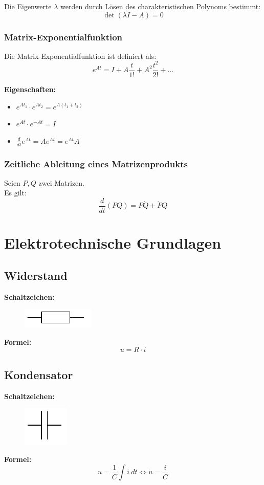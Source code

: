 \documentclass[10pt,a4paper]{article}
\begin{document}
Die Eigenwerte $\lambda$ werden durch Lösen des charakteristischen Polynoms bestimmt:
$$
	\det(\lambda I - A) = 0
$$

\subsubsection{Matrix-Exponentialfunktion}
Die Matrix-Exponentialfunktion ist definiert als:
$$
	e^{At} = I + A\frac{t}{1!} + A^2 \frac{t^2}{2!} + \dots
$$

\textbf{Eigenschaften:}
\begin{itemize}
	\item $e^{At_1} ⋅ e^{At_2} = e^{A(t_1 + t_2)}$
	\item $e^{At} ⋅ e^{-At} = I$
	\item $\frac{d}{dt} e^{At} = Ae^{At} = e^{At}A$
\end{itemize}

\subsubsection{Zeitliche Ableitung eines Matrizenprodukts}
Seien $P,Q$ zwei Matrizen. \\
Es gilt:
$$
	\frac{d}{dt}(PQ) = P \dot Q + \dot P Q
$$

\section{Elektrotechnische Grundlagen}
\subsection{Widerstand}
\textbf{Schaltzeichen:} \\
\begin{figure}[H]
	\includegraphics[width=0.15\columnwidth]{imgs/widerstand.pdf}
\end{figure}
\textbf{Formel:}
$$
	u = R ⋅ i
$$

\subsection{Kondensator}
\textbf{Schaltzeichen:} \\
\begin{figure}[H]
	\includegraphics[width=0.1\columnwidth]{imgs/kondensator.pdf}
\end{figure}
\textbf{Formel:}
$$
	u = \frac 1 C \int i ~dt \iff \dot u = \frac i C
$$
\end{document}
